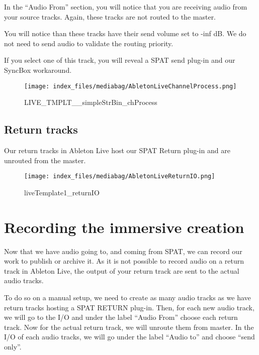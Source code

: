 \documentclass[
  letterpaper,
  DIV=11,
  numbers=noendperiod]{scrreport}
\begin{document}
In the ``Audio From'' section, you will notice that you are receiving
audio from your source tracks. Again, these tracks are not routed to the
master.

You will notice than these tracks have their send volume set to -inf dB.
We do not need to send audio to validate the routing priority.

If you select one of this track, you will reveal a SPAT send plug-in and
our SyncBox workaround.

\begin{figure}

{\centering \texttt{[image: index\_files/mediabag/AbletonLiveChannelProcess.png]}

}

\caption{LIVE\_TMPLT\_\_simpleStrBin\_chProcess}

\end{figure}

\hypertarget{return-tracks}{%
\subsection{Return tracks}\label{return-tracks}}

Our return tracks in Ableton Live host our SPAT Return plug-in and are
unrouted from the master.

\begin{figure}

{\centering \texttt{[image: index\_files/mediabag/AbletonLiveReturnIO.png]}

}

\caption{liveTemplate1\_returnIO}

\end{figure}

\hypertarget{recording-the-immersive-creation}{%
\section{Recording the immersive
creation}\label{recording-the-immersive-creation}}

Now that we have audio going to, and coming from SPAT, we can record our
work to publish or archive it. As it is not possible to record audio on
a return track in Ableton Live, the output of your return track are sent
to the actual audio tracks.

To do so on a manual setup, we need to create as many audio tracks as we
have return tracks hosting a SPAT RETURN plug-in. Then, for each new
audio track, we will go to the I/O and under the label ``Audio From''
choose each return track. Now for the actual return track, we will
unroute them from master. In the I/O of each audio tracks, we will go
under the label ``Audio to'' and choose ``send only''.
\end{document}
